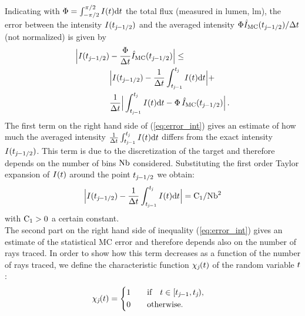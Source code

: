 Indicating with $\Phi = \int_{-\pi/2}^{\pi/2}I(t) \textrm{d}t$ the total flux (measured in lumen, $\textrm{lm}$),
the error between the intensity $I(t_{\textit{j}-1/2})$ and the averaged  intensity $\Phi \hat{I}_{\textrm{MC}}(t_{\textit{j}-1/2})/\Delta t$ (not normalized) is given by
\begin{equation}\label{eq:error_int}
\begin{aligned}
\Big|I(t_{\textit{j}-1/2})&-\frac{\Phi}
{\Delta t}\hat{I}_{\textrm{MC}}(t_{\textit{j}-1/2})\Big| \leq\\
 &\Big|I(t_{\textit{j}-1/2})-\frac{1}{\Delta t}\int_{t_{\textit{j}-1}}^{t_{\textit{j}}} I(t)\textrm{d}t\Big|+\\
&\frac{1}{\Delta t}\Big|\int_{t_{\textit{j}-1}}^{t_{\textit{j}}} I(t)\textrm{d}t-
\Phi\, \hat{I}_{\textrm{MC}}(t_{\textit{j}-1/2})\Big| \,.
\end{aligned}
\end{equation}
\indent The first term on the right hand side of (\ref{eq:error_int}) gives an estimate of how much the averaged intensity
 $\frac{1}{\Delta t}\int_{t_{\textit{j}-1}}^{t_{\textit{j}}} I(t)\textrm{d}t$ differs from the exact intensity $I(t_{\textit{j}-1/2})$.
This term is due to the discretization of the target and therefore depends on the number of bins $\textrm{Nb}$ considered. Substituting the first order Taylor expansion of $I(t)$ around the point $t_{\textit{j}-1/2}$ we obtain:
\begin{equation}\Big|I(t_{\textit{j}-1/2})-\frac{1}{\Delta t}\int_{t_{\textit{j}-1}}^{t_{\textit{j}}} I(t)\textrm{d}t\Big| = \textrm{C}_1/\textrm{Nb}^2\end{equation}
with $\textrm{C}_1>0$ a certain constant. \\
\indent
The second part on the right hand side of inequality (\ref{eq:error_int}) gives an estimate of the statistical MC error and therefore depends also on the
number of rays traced.
In order to show how this term decreases as a function of the number of rays traced,
we define the characteristic function $\chi_{\textit{j}}(t)$ of the random variable $t$:
\begin{equation}
\label{radom_variable}
\chi_{\textit{j}}(t) = \begin{cases} \begin{aligned}
1& \qquad \mbox{if} \quad t\in [t_{\textit{j}-1}, t_{\textit{j}}),\\
0 & \qquad \mbox{otherwise}.
\end{aligned}\end{cases}
\end{equation}
